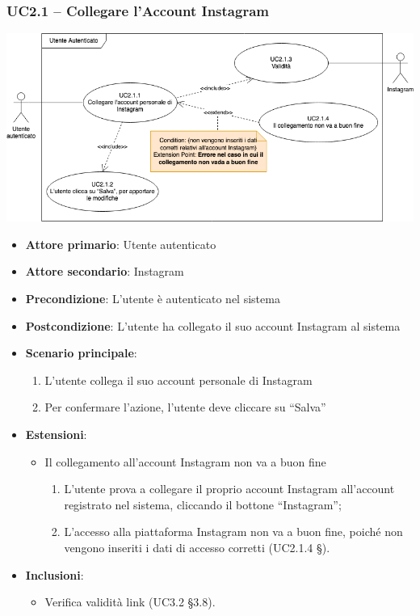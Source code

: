 \subsubsection{UC2.1 – Collegare l'Account Instagram}
\begin{center}
\includegraphics[scale=0.5]{UC_images/UC2_1.png}
\end{center}
\begin{itemize}
\item \textbf{Attore primario}: Utente autenticato
\item \textbf{Attore secondario}: Instagram
\item \textbf{Precondizione}: L’utente è autenticato nel sistema
\item \textbf{Postcondizione}: L’utente ha collegato il suo account Instagram al sistema

\item \textbf{Scenario principale}:
\begin{enumerate}
\item L’utente collega il suo account personale di Instagram
\item Per confermare l’azione, l’utente deve cliccare su “Salva” 
\end{enumerate}

\item \textbf{Estensioni}:
\begin{itemize}
\item Il collegamento all’account Instagram non va a buon fine
\begin{enumerate}
	\item L’utente prova a collegare il proprio account Instagram all’account registrato nel sistema, cliccando il bottone “Instagram”;
	\item L’accesso alla piattaforma Instagram non va a buon fine, poiché non vengono inseriti i dati di accesso corretti (UC2.1.4 §).
\end{enumerate}
\end{itemize}

\item \textbf{Inclusioni}:
\begin{itemize}
\item Verifica validità link (UC3.2 §3.8).
\end{itemize}
\end{itemize}

